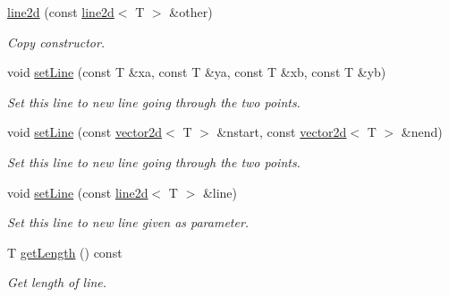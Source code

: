 \begin{DoxyCompactItemize}
\mbox{\label{classirr_1_1core_1_1line2d_a19338e17d69fa3062709ebd7b7f73409}} 
\hyperlink{classirr_1_1core_1_1line2d_a19338e17d69fa3062709ebd7b7f73409}{line2d} (const \hyperlink{classirr_1_1core_1_1line2d}{line2d}$<$ T $>$ \&other)
\begin{DoxyCompactList}\small\item\em Copy constructor. \end{DoxyCompactList}\item 
\mbox{\label{classirr_1_1core_1_1line2d_a65224228a0681a6be6f2576fb0093a12}} 
void \hyperlink{classirr_1_1core_1_1line2d_a65224228a0681a6be6f2576fb0093a12}{set\+Line} (const T \&xa, const T \&ya, const T \&xb, const T \&yb)
\begin{DoxyCompactList}\small\item\em Set this line to new line going through the two points. \end{DoxyCompactList}\item 
\mbox{\label{classirr_1_1core_1_1line2d_a2573eb6b41d08ae4ab16be2630168d3b}} 
void \hyperlink{classirr_1_1core_1_1line2d_a2573eb6b41d08ae4ab16be2630168d3b}{set\+Line} (const \hyperlink{classirr_1_1core_1_1vector2d}{vector2d}$<$ T $>$ \&nstart, const \hyperlink{classirr_1_1core_1_1vector2d}{vector2d}$<$ T $>$ \&nend)
\begin{DoxyCompactList}\small\item\em Set this line to new line going through the two points. \end{DoxyCompactList}\item 
\mbox{\label{classirr_1_1core_1_1line2d_af7a159fc82aff5dcab173fcd24934df1}} 
void \hyperlink{classirr_1_1core_1_1line2d_af7a159fc82aff5dcab173fcd24934df1}{set\+Line} (const \hyperlink{classirr_1_1core_1_1line2d}{line2d}$<$ T $>$ \&line)
\begin{DoxyCompactList}\small\item\em Set this line to new line given as parameter. \end{DoxyCompactList}\item 
T \hyperlink{classirr_1_1core_1_1line2d_a7322cb613e5e076ce6ff258e0f67dc0a}{get\+Length} () const
\begin{DoxyCompactList}\small\item\em Get length of line. \end{DoxyCompactList}\item 

\end{DoxyCompactItemize}
